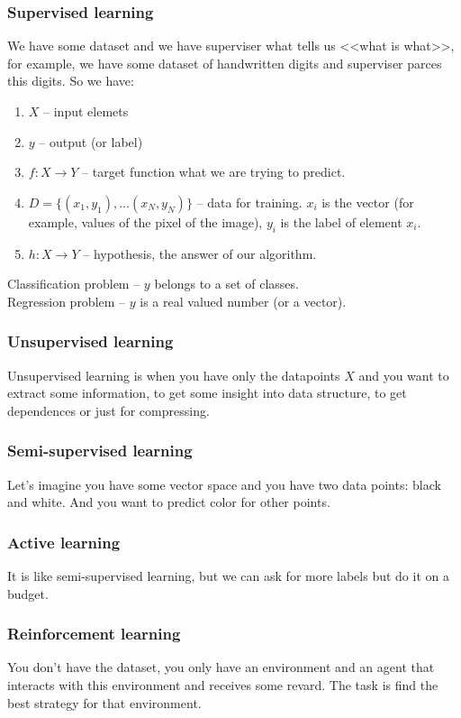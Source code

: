 \subsubsection*{Supervised learning}

We have some dataset and we have superviser what tells us <<what is what>>, for example, we have some dataset of handwritten digits and superviser parces this digits. So we have:
\begin{enumerate}[label=$\bullet$]
	\item $X$ -- input elemets
	\item $y$ -- output (or label)
	\item $f\colon X\to Y$ -- target function what we are trying to predict.
	\item $D=\{(x_1,y_1),\ldots(x_N,y_N)\}$ -- data for training. $x_i$ is the vector (for example, values of the pixel of the image), $y_i$ is the label of element $x_i$.
	\item $h\colon X\to Y$ -- hypothesis, the answer of our algorithm.
\end{enumerate}
Classification problem -- $y$ belongs to a set of classes.\\
Regression problem -- $y$ is a real valued number (or a vector).

\subsubsection*{Unsupervised learning}

Unsupervised learning is when you have only the datapoints $X$ and you want to extract some information, to get some insight into data structure, to get dependences or just for compressing. 

\subsubsection*{Semi-supervised learning}

Let's imagine you have some vector space and you have two data points: black and white. And you want to predict color for other points.

\subsubsection*{Active learning}

It is like semi-supervised learning, but we can ask for more labels but do it on a budget.

\subsubsection*{Reinforcement learning}

You don't have the dataset, you only have an environment and an agent that interacts with this environment and receives some revard. The task is find the best strategy for that environment.
